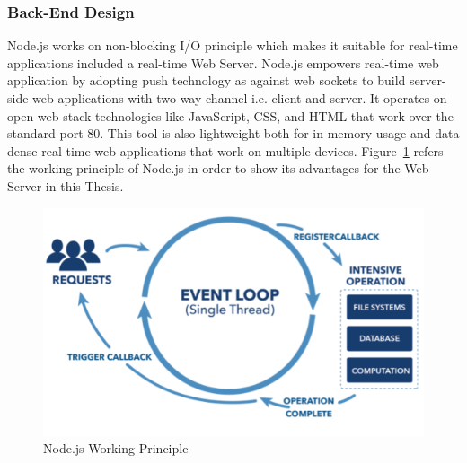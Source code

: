         \subsubsection{Back-End Design}
        Node.js works on non-blocking I/O principle which makes it suitable for real-time applications included a real-time Web Server. Node.js empowers real-time web application by adopting push technology as against web sockets to build server-side web applications with two-way channel i.e. client and server. It operates on open web stack technologies like JavaScript, CSS, and HTML that work over the standard port 80. This tool is also lightweight both for in-memory usage and data dense real-time web applications that work on multiple devices. Figure~\ref{fig:nonBlocking} refers the working principle of Node.js in order to show its advantages for the Web Server in this Thesis.
        \begin{figure}[!htb]
            \begin{center}
            \includegraphics[scale=0.65]{images/nonBlocking.png}
            \caption{Node.js Working Principle}
            \label{fig:nonBlocking}
            \end{center}
        \end{figure}

